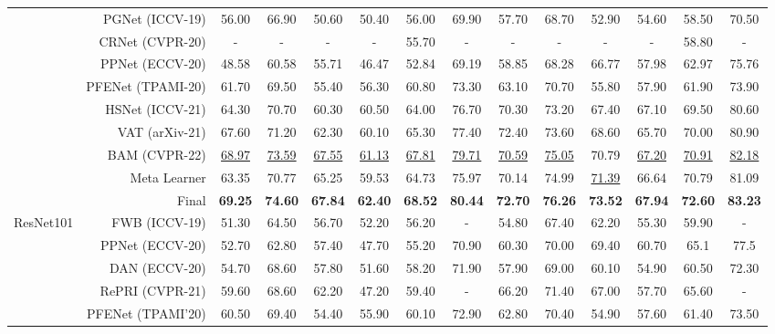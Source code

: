 \documentclass[10pt,twocolumn,letterpaper]{article}
\begin{document}
\begin{table*}[t]
\begin{adjustbox}{width=1\textwidth}
\begin{tabular}{l r| c c c c c c| c c c c c c}
&PGNet (ICCV-19) \cite{FSS15} & 56.00 & 66.90 & 50.60 & 50.40 & 56.00 & 69.90 & 57.70 & 68.70 & 52.90 & 54.60 & 58.50 & 70.50\\
&CRNet (CVPR-20) \cite{FSS6crnet} & - & - & - & - & 55.70 & - & - & - & - & - & 58.80 & -\\
&PPNet (ECCV-20) \cite{FSS7} & 48.58 & 60.58 & 55.71 & 46.47 & 52.84 & 69.19 & 58.85 & 68.28 & 66.77 & 57.98 & 62.97 & 75.76\\
&PFENet (TPAMI-20) \cite{FSS2PFE} & 61.70 & 69.50 & 55.40 & 56.30 & 60.80 & 73.30 & 63.10 & 70.70 & 55.80 & 57.90 & 61.90 & 73.90\\
&HSNet (ICCV-21) \cite{FSS9Hsnet} & 64.30 & 70.70 & 60.30 & 60.50 & 64.00 & 76.70 & 70.30 & 73.20 & 67.40 & 67.10 & 69.50 & 80.60\\
&VAT (arXiv-21) \cite{vat} & 67.60 & 71.20 & 62.30 & 60.10 & 65.30 & 77.40 & 72.40 & 73.60 & 68.60 & 65.70 & 70.00 & 80.90\\
&BAM (CVPR-22) \cite{BAM} & \underline{68.97} & \underline{73.59} & \underline{67.55} &\underline{ 61.13} & \underline{67.81} & \underline{79.71} & \underline{70.59} & \underline{75.05} & 70.79 & \underline{67.20} & \underline{70.91} & \underline{82.18}\\
\cline{2-14}
&Meta Learner & 63.35 & 70.77 & 65.25 & 59.53 & 64.73 & 75.97 & 70.14 & 74.99 & \underline{71.39} & 66.64 & 70.79 & 81.09\\
\rowcolor{lightgray}
\cellcolor[HTML]{FFFFFF} &Final & \textbf{69.25} & \textbf{74.60} & \textbf{67.84} & \textbf{62.40} & \textbf{68.52} & \textbf{80.44}& \textbf{72.70} & \textbf{76.26} & \textbf{73.52} & \textbf{67.94} & \textbf{72.60} & \textbf{83.23}\\\midrule
\multirow{10}{*}{ResNet101} & FWB (ICCV-19)\cite{coco20} & 51.30 & 64.50 & 56.70 & 52.20 & 56.20 & - & 54.80 & 67.40 & 62.20 & 55.30 & 59.90 & -\\
&PPNet (ECCV-20) \cite{FSS7} & 52.70 & 62.80 & 57.40 & 47.70 & 55.20 & 70.90 & 60.30 & 70.00 & 69.40 & 60.70 & 65.1 & 77.5\\
&DAN (ECCV-20)\cite{FSS11} & 54.70 & 68.60 & 57.80 & 51.60 & 58.20 & 71.90 & 57.90 & 69.00 & 60.10 & 54.90 & 60.50 & 72.30\\
&RePRI (CVPR-21) \cite{repri} & 59.60 & 68.60 & 62.20 & 47.20 & 59.40 & - & 66.20 & 71.40 & 67.00 & 57.70 & 65.60 & -\\
&PFENet (TPAMI’20) \cite{FSS2PFE} & 60.50 & 69.40 & 54.40 & 55.90 & 60.10 & 72.90 & 62.80 & 70.40 & 54.90 & 57.60 & 61.40 & 73.50\\

\end{tabular}
\end{adjustbox}
\end{table*}
\end{document}

